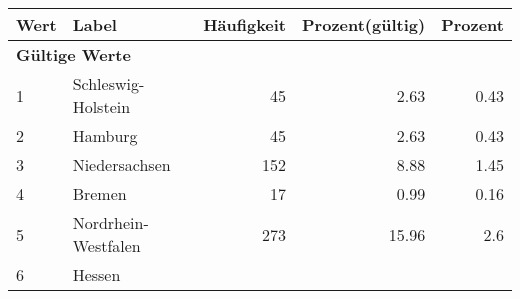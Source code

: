      \begin{longtable}{lXrrr}
     \toprule
     \textbf{Wert} & \textbf{Label} & \textbf{Häufigkeit} & \textbf{Prozent(gültig)} & \textbf{Prozent} \\
     \endhead
     \midrule
     \multicolumn{5}{l}{\textbf{Gültige Werte}}\\

     1 &
     \multicolumn{1}{X}{ Schleswig-Holstein   } &


       \num{45} &
       \num[round-mode=places,round-precision=2]{2.63} &
         \num[round-mode=places,round-precision=2]{0.43} \\

     2 &
     \multicolumn{1}{X}{ Hamburg   } &


       \num{45} &
       \num[round-mode=places,round-precision=2]{2.63} &
         \num[round-mode=places,round-precision=2]{0.43} \\

     3 &
     \multicolumn{1}{X}{ Niedersachsen   } &


       \num{152} &
       \num[round-mode=places,round-precision=2]{8.88} &
         \num[round-mode=places,round-precision=2]{1.45} \\

     4 &
     \multicolumn{1}{X}{ Bremen   } &


       \num{17} &
       \num[round-mode=places,round-precision=2]{0.99} &
         \num[round-mode=places,round-precision=2]{0.16} \\

     5 &
     \multicolumn{1}{X}{ Nordrhein-Westfalen   } &


       \num{273} &
       \num[round-mode=places,round-precision=2]{15.96} &
         \num[round-mode=places,round-precision=2]{2.6} \\

     6 &
     \multicolumn{1}{X}{ Hessen   } &



\end{longtable}
